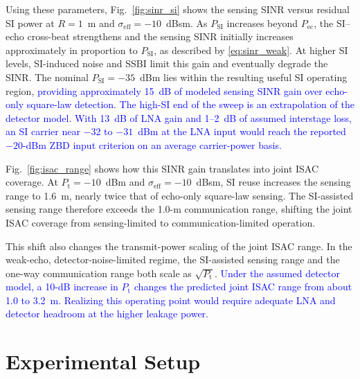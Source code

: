 \documentclass[10pt,journal]{IEEEtran}
\DeclareRobustCommand{\rev}[1]{\textcolor{blue}{#1}}
\begin{document}
Using these parameters, Fig.~\ref{fig:sinr_si} shows the sensing SINR
versus residual SI power at $R=1$~m and
$\sigma_{\mathrm{eff}}=-10$~dBsm. As $P_{\mathrm{SI}}$ increases beyond $P_{\mathrm{ec}}$, the
SI--echo cross-beat strengthens and the sensing SINR initially increases
approximately in proportion to $P_{\mathrm{SI}}$, as described by
\eqref{eq:sinr_weak}. At higher SI
levels, SI-induced noise and SSBI limit this gain and eventually
degrade the SINR. The nominal $P_{\mathrm{SI}}=-35$~dBm lies within
the resulting useful SI operating region, \rev{providing approximately 15~dB of modeled sensing SINR gain over
echo-only square-law detection. The high-SI end of the sweep is an
extrapolation of the detector model. With 13~dB of LNA gain and
1--2~dB of assumed interstage loss, an SI carrier near
$-32$ to $-31$~dBm at the LNA input would reach the reported
$-20$-dBm ZBD input criterion on an average carrier-power basis.}

Fig.~\ref{fig:isac_range} shows how this SINR gain translates into
joint ISAC coverage. At $P_{\mathrm t}=-10$~dBm and
$\sigma_{\mathrm{eff}}=-10$~dBsm, SI reuse increases the sensing range
to 1.6~m, nearly twice that of echo-only square-law sensing. The
SI-assisted sensing range therefore exceeds the 1.0-m communication
range, shifting the joint ISAC coverage from sensing-limited to
communication-limited operation.

This shift also changes the transmit-power scaling of the joint ISAC
range. In the weak-echo, detector-noise-limited regime, the
SI-assisted sensing range and the one-way communication range both
scale as $\sqrt{P_{\mathrm t}}$. \rev{Under the assumed detector model, a 10-dB increase in
$P_{\mathrm t}$ changes the predicted joint ISAC range from about
1.0 to 3.2~m. Realizing this operating point would require adequate
LNA and detector headroom at the higher leakage power.}

\section{Experimental Setup}
\label{sec:experimental_setup}
\end{document}

